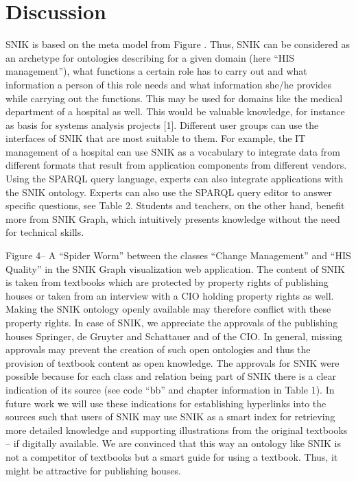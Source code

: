\documentclass[conference]{IEEEtran}
\begin{document}
\section{Discussion}
SNIK is based on the meta model from Figure .
Thus, SNIK can be considered as an archetype for ontologies describing for a given domain (here \enquote{HIS management}), what functions a certain role has to carry out and what information a person of this role needs and what information she/he provides while carrying out the functions.
This may be used for domains like the medical department of a hospital as well.
This would be valuable knowledge, for instance as basis for systems analysis projects [1].
Different user groups can use the interfaces of SNIK that are most suitable to them.
For example, the IT management of a hospital can use SNIK as a vocabulary to integrate data from different formats that result from application components from different vendors.
Using the SPARQL query language, experts can also integrate applications with the SNIK ontology.
 Experts can also use the SPARQL query editor to answer specific questions, see Table 2.
Students and teachers, on the other hand, benefit more from SNIK Graph, which intuitively presents knowledge without the need for technical skills.

Figure 4– A \enquote{Spider Worm} between the classes \enquote{Change Management} and \enquote{HIS Quality} in the SNIK Graph visualization web application.
The content of SNIK is taken from textbooks which are protected by property rights of publishing houses or taken from an interview with a CIO holding property rights as well.
Making the SNIK ontology openly available may therefore conflict with these property rights.
In case of SNIK, we appreciate the approvals of the publishing houses Springer, de Gruyter and Schattauer and of the CIO.
In general, missing approvals may prevent the creation of such open ontologies and thus the provision of textbook content as open knowledge.
The approvals for SNIK were possible because for each class and relation being part of SNIK there is a clear indication of its source (see code \enquote{bb} and chapter information in Table 1).
In future work we will use these indications for establishing hyperlinks into the sources such that users of SNIK may use SNIK as a smart index for retrieving more detailed knowledge and supporting illustrations from the original textbooks – if digitally available.
We are convinced that this way an ontology like SNIK is not a competitor of textbooks but a smart guide for using a textbook.
Thus, it might be attractive for publishing houses.
\fi
{}
\end{document}
